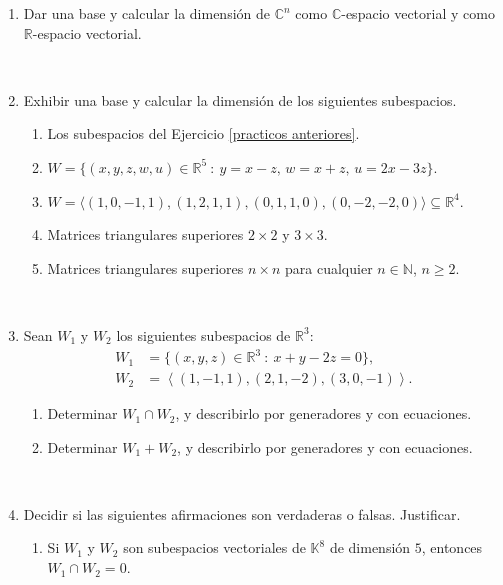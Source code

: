 \documentclass[12pt]{amsart}
\begin{document}
\begin{enumerate}
\

\item Dar una base y calcular la dimensi\'on de $\mathbb{C}^n$ como $\mathbb{C}$-espacio vectorial y como $\mathbb{R}$-espacio vectorial.

\

\item  Exhibir una base y calcular la dimensi\'on de los siguientes subespacios.

 \begin{enumerate}
    \item Los subespacios del Ejercicio \eqref{practicos anteriores}.
	\item $W = \{(x,y,z,w,u) \in \mathbb{R}^5 \ : \ y = x - z,\, w = x + z,\,  u = 2x - 3z \}$.
	\item $W = \langle (1, 0, -1, 1),  (1, 2, 1, 1), (0, 1, 1, 0), (0, -2, -2, 0) \rangle \subseteq \mathbb R^4$.
	\item Matrices triangulares superiores $2\times 2$ y $3\times 3$.
	\item Matrices triangulares superiores $n\times n$ para cualquier $n\in\mathbb{N}$, $n\geq 2$.
\end{enumerate}

\

\item Sean $W_1$ y $W_2$ los siguientes subespacios de $\mathbb{R}^3$:
	\begin{align*}
	W_1 &= \{ (x,y,z)\in\mathbb{R}^3\ : \ x+y-2z=0\},  \\
	W_2 &= {\left\langle(1,-1,1),(2,1,-2),(3,0,-1)\right\rangle}.
	\end{align*}
	\begin{enumerate}
		\item  Determinar $W_1 \cap W_2$, y describirlo por generadores y con ecuaciones.
		\item  Determinar $W_1+W_2$, y describirlo por generadores y con ecuaciones.
	\end{enumerate}

\

\item Decidir si las siguientes afirmaciones son verdaderas o falsas. Justificar.

\begin{enumerate}
 \item Si $W_1$ y $W_2$ son subespacios vectoriales de $\mathbb{K}^8$ de dimensi\'on $5$, entonces $W_1\cap W_2=0$.


\end{enumerate}
\end{enumerate}
\end{document}
